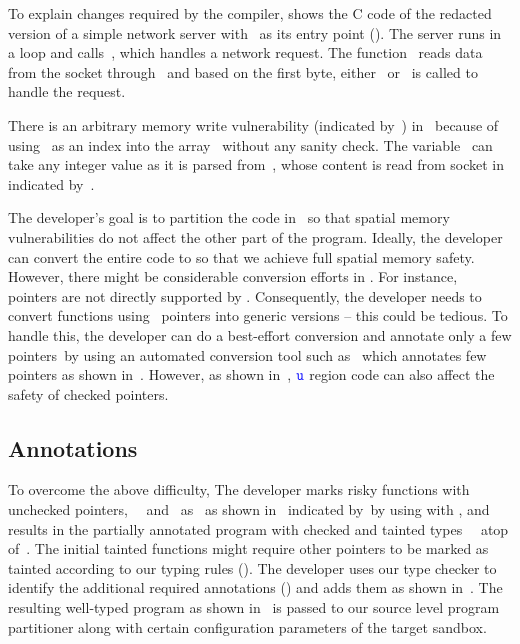 To explain changes required by the \systemname compiler,  shows the C code of the redacted version of a simple network server with~ as its entry point (\entrypoint).
The server runs in a loop and calls~, which handles a network request.
The function~ reads data from the socket through~ and based on the first byte, either~ or~ is called to handle the request.

There is an arbitrary memory write vulnerability (indicated by~\realbug) in~ because of using~ as an index into the array~ without any sanity check.
The variable~ can take any integer value as it is parsed from~, whose content is read from socket in~ indicated by~\rootcause.

The developer's goal is to partition the code in~ so that spatial memory vulnerabilities do not affect the other part of the program.
Ideally, the developer can convert the entire code to \checkedc so that we achieve full spatial memory safety.
However, there might be considerable conversion efforts in \checkedc.
For instance,~ pointers are not directly supported by \checkedc.
Consequently, the developer needs to convert functions using~ pointers into generic versions -- this could be tedious.
To handle this, the developer can do a best-effort conversion and annotate only a few pointers~\eg by using an automated conversion tool such as~\threec{} which annotates few pointers as shown in~.
However, as shown in~, $\textcolor{blue}{\texttt{u}}$ region code can also affect the safety of checked pointers.

\subsection{\systemname Annotations}
\label{subsec:moveregionstosbx}
To overcome the above difficulty, The developer marks risky functions with unchecked pointers,~\ie~ and~ as~ as shown in~ indicated by~\useradded by using with \systemname{},
 and results in the partially annotated program with checked and tainted types~\ie~ atop of~.
The initial tainted functions might require other pointers to be marked as tainted according to our typing rules ().
The developer uses our type checker to identify the additional required annotations (\usermods) and adds them as shown in~.
The resulting well-typed program as shown in~ is passed to our source level program partitioner along with certain configuration parameters of the target sandbox.

